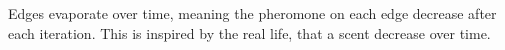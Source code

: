 \begin{algorithm}[H]
\end{algorithm}

Edges evaporate over time, meaning the pheromone on each edge decrease after each iteration. This is inspired by the real life, that a scent decrease over time.





